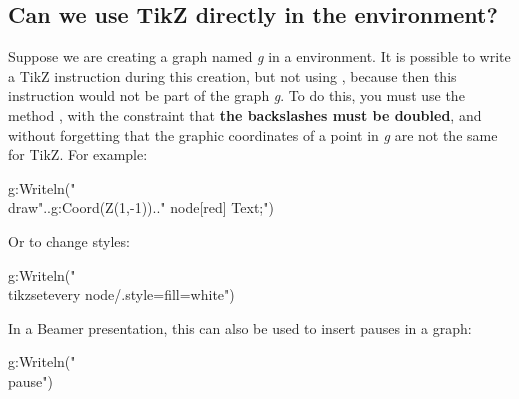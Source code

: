 \subsection{Can we use TikZ directly in the \luadrawenv environment?}

Suppose we are creating a graph named \emph{g} in a \luadrawenv environment. It is possible to write a TikZ instruction during this creation, but not using , because then this instruction would not be part of the graph \emph{g}. To do this, you must use the method , with the constraint that \textbf{the backslashes must be doubled}, and without forgetting that the graphic coordinates of a point in \emph{g} are not the same for TikZ. For example:

\begin{Luacode}
g:Writeln("\\draw"..g:Coord(Z(1,-1)).." node[red] {Text};")
\end{Luacode}

Or to change styles:
\begin{Luacode}
g:Writeln("\\tikzset{every node/.style={fill=white}}")
\end{Luacode}

In a Beamer presentation, this can also be used to insert pauses in a graph:
\begin{Luacode}
g:Writeln("\\pause")
\end{Luacode}
